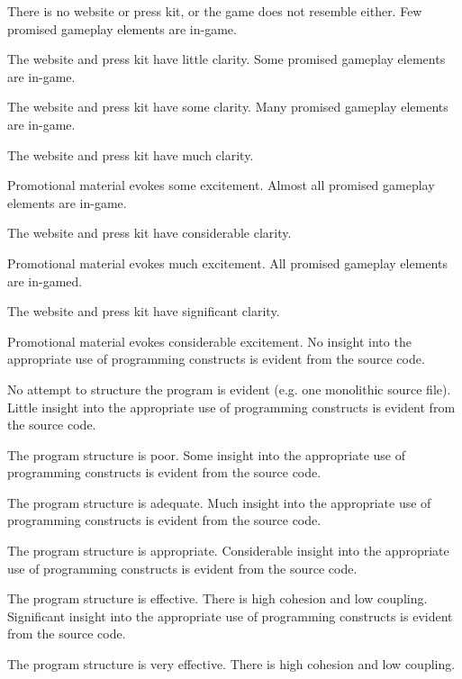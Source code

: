 \documentclass{../../fal_assignment}
\begin{document}
\begin{markingrubric}
%            
        \grade\fail There is no website or press kit, or the game does not resemble either.
        \grade Few promised gameplay elements are in-game.
            \par The website and press kit have little clarity.
        \grade Some promised gameplay elements are in-game.
            \par The website and press kit have some clarity.
        \grade Many promised gameplay elements are in-game.
            \par The website and press kit have much clarity.
            \par Promotional material evokes some excitement.
        \grade Almost all promised gameplay elements are in-game.
            \par The website and press kit have considerable clarity.
            \par Promotional material evokes much excitement.
        \grade All promised gameplay elements are in-gamed.
            \par The website and press kit have significant clarity.
            \par Promotional material evokes considerable excitement.
%
        \grade\fail No insight into the appropriate use of programming constructs is evident from the source code.
            \par No attempt to structure the program is evident (e.g. one monolithic source file).
        \grade Little insight into the appropriate use of programming constructs is evident from the source code.
            \par The program structure is poor.
        \grade Some insight into the appropriate use of programming constructs is evident from the source code.
            \par The program structure is adequate.
        \grade Much insight into the appropriate use of programming constructs is evident from the source code.
            \par The program structure is appropriate.
        \grade Considerable insight into the appropriate use of programming constructs is evident from the source code.
            \par The program structure is effective. There is high cohesion and low coupling.
        \grade Significant insight into the appropriate use of programming constructs is evident from the source code.
            \par The program structure is very effective. There is high cohesion and low coupling.            
\end{markingrubric}
\end{document}
